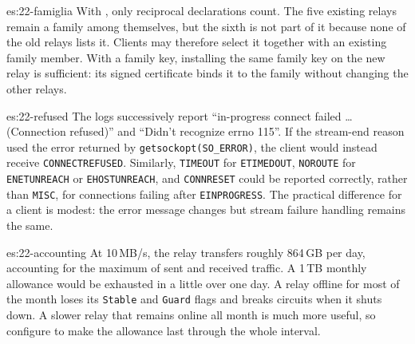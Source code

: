\begin{soluzione}{es:22-famiglia}
With , only reciprocal declarations count. The five existing relays remain a family among themselves, but the sixth is not part of it because none of the old relays lists it. Clients may therefore select it together with an existing family member. With a family key, installing the same family key on the new relay is sufficient: its signed certificate binds it to the family without changing the other relays.
\end{soluzione}

\begin{soluzione}{es:22-refused}
The logs successively report \enquote{in-progress connect failed \ldots (Connection refused)} and \enquote{Didn't recognize errno 115}. If the stream-end reason used the error returned by \texttt{getsockopt(SO\_ERROR)}, the client would instead receive \texttt{CONNECTREFUSED}. Similarly, \texttt{TIMEOUT} for \texttt{ETIMEDOUT}, \texttt{NOROUTE} for \texttt{ENETUNREACH} or \texttt{EHOSTUNREACH}, and \texttt{CONNRESET} could be reported correctly, rather than \texttt{MISC}, for connections failing after \texttt{EINPROGRESS}. The practical difference for a client is modest: the error message changes but stream failure handling remains the same.
\end{soluzione}

\begin{soluzione}{es:22-accounting}
At 10\,MB/s, the relay transfers roughly 864\,GB per day, accounting for the maximum of sent and received traffic. A 1\,TB monthly allowance would be exhausted in a little over one day. A relay offline for most of the month loses its \texttt{Stable} and \texttt{Guard} flags and breaks circuits when it shuts down. A slower relay that remains online all month is much more useful, so configure  to make the allowance last through the whole interval.
\end{soluzione}
